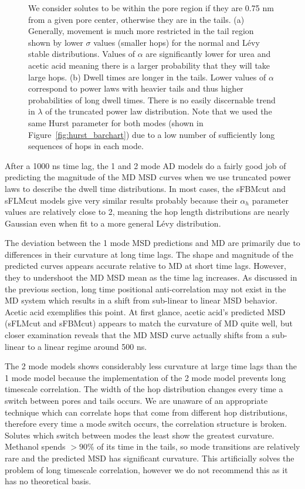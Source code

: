 \documentclass[12pt]{article}
\begin{document}
\begin{figure}
{  We consider solutes to be within the pore region if they are 0.75 nm from a given pore
  center, otherwise they are in the tails. (a) Generally, movement is much more restricted
  in the tail region shown by lower $\sigma$ values (smaller hops) for the normal and L\'evy stable 
  distributions. Values of $\alpha$ are significantly lower for urea and acetic acid meaning 
  there is a larger probability that they will take large hops. (b) Dwell times are longer in 
  the tails. Lower values of $\alpha$ correspond to power laws with heavier tails and 
  thus higher probabilities of long dwell times. There is no easily discernable trend in
  $\lambda$ of the truncated power law distribution. Note that we used the same Hurst parameter
  for both modes (shown in Figure~\ref{fig:hurst_barchart}) due to a low number of 
  sufficiently long sequences of hops in each mode.}
  \label{fig:2mode_parameters}
  \end{figure} 
  
  After a 1000 ns time lag, the 1 and 2 mode AD models do a fairly good job of 
  predicting the magnitude of the MD MSD curves when we use truncated power
  laws to describe the dwell time distributions. In most cases, the sFBMcut
  and sFLMcut models give very similar results probably because their $\alpha_h$
  parameter values are relatively close to 2, meaning the hop length distributions
  are nearly Gaussian even when fit to a more general L\'evy distribution. 
  
  The deviation between the 1 mode MSD predictions and MD are primarily due
  to differences in their curvature at long time lags. The shape and magnitude of 
  the predicted curves appears accurate relative to MD at short time lags.  
  However, they to undershoot the MD MSD mean as the time lag increases. As 
  discussed in the previous section, long time
  positional anti-correlation may not exist in the MD system which results 
  in a shift from sub-linear to linear MSD behavior. Acetic acid exemplifies
  this point. At first glance, acetic acid's predicted MSD (sFLMcut and sFBMcut)
  appears to match the curvature of MD quite well, but closer examination reveals
  that the MD MSD curve actually shifts from a sub-linear to a linear regime 
  around 500 ns.
  
  The 2 mode models shows considerably less curvature at large time lags than
  the 1 mode model because the implementation of the 2 mode model prevents long
  timescale correlation. The width of the hop distribution changes every time
  a switch between pores and tails occurs. We are unaware of an appropriate
  technique which can correlate hops that come from different hop distributions, 
  therefore every time a mode switch occurs, the correlation structure is 
  broken. Solutes which switch between modes the least show the greatest
  curvature. Methanol spends $> 90\%$ of its time in the tails, so mode transitions
  are relatively rare and the predicted MSD has significant curvature. This artificially
  solves the problem of long timescale correlation, however we do not recommend this
  as it has no theoretical basis.
  
\end{document}
